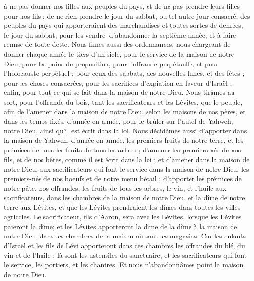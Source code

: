 \begin{multicols}{2}
à ne pas donner nos filles aux peuples du pays, et de ne  pas prendre leurs filles pour nos fils ;
de ne rien prendre le jour du sabbat, ou tel autre jour consacré, des peuples du pays qui apporteraient des marchandises et toutes sortes de denrées, le jour du sabbat, pour les vendre, d'abandonner la septième année, et à faire remise de toute dette.
Nous fîmes aussi des ordonnances, nous chargeant de donner chaque année le tiers d'un sicle, pour le service de la maison de notre Dieu,
pour les pains de proposition, pour l’offrande perpétuelle, et pour l'holocauste perpétuel ; pour ceux des sabbats, des nouvelles lunes, et des fêtes ; pour les choses consacrées,  pour les sacrifices d'expiation en faveur d’Israël ; enfin, pour tout ce qui se fait dans la maison de notre Dieu.
Nous tirâmes au sort, pour l'offrande du bois, tant les sacrificateurs et les Lévites, que le peuple, afin de l'amener dans la maison de notre Dieu, selon les maisons de nos pères, et dans les temps fixés, d'année en année, pour le brûler sur l'autel de Yahweh, notre Dieu, ainsi qu'il est écrit dans la loi.
Nous décidâmes aussi d'apporter dans la maison de Yahweh, d'année en année, les premiers fruits de notre terre, et les prémices de tous les fruits de tous les arbres ;
d’amener les premiers-nés de nos fils, et de nos bêtes, comme il est écrit dans la loi ; et d’amener dans la maison de notre Dieu, aux sacrificateurs qui font le service dans la maison de notre Dieu, les premiers-nés de nos boeufs et de notre menu bétail ;
d’apporter les prémices de notre pâte, nos offrandes, les fruits de tous les arbres, le vin, et l'huile aux sacrificateurs, dans les chambres de la maison de notre Dieu, et la dîme de notre terre aux Lévites, et que les Lévites prendraient les dîmes dans toutes les villes agricoles.
Le sacrificateur, fils d'Aaron, sera avec les Lévites, lorsque les Lévites paieront la dîme; et les Lévites apporteront la dîme de la dîme à la maison de notre Dieu, dans les chambres de la maison où sont les magasins.
Car les enfants d'Israël et les fils de Lévi apporteront dans ces chambres les offrandes du blé, du vin et de l'huile ; là sont les ustensiles du sanctuaire, et les sacrificateurs qui font le service, les portiers, et les chantres. Et nous n'abandonnâmes point la maison de notre Dieu.

\end{multicols}
